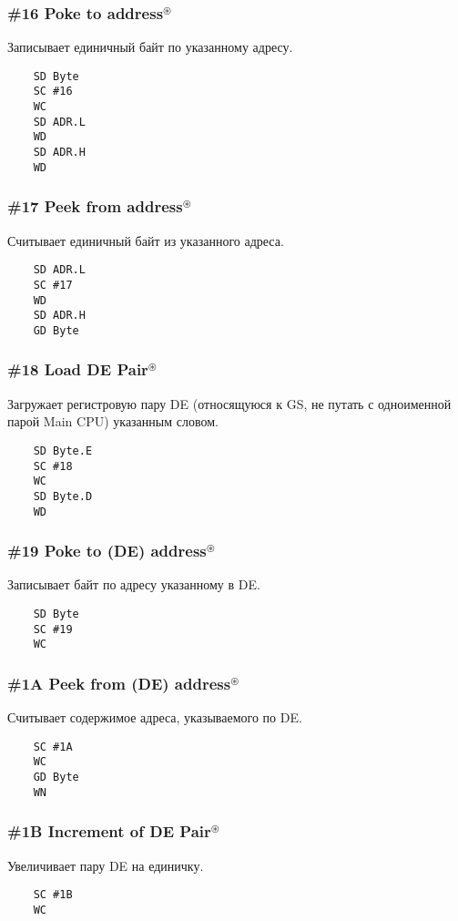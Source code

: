 \documentclass[a4paper,11pt]{article}
\DeclareRobustCommand{\Cyrax}{\texorpdfstring{\(^\circledast\)}{\circledast}}
\begin{document}
\subsubsection{\#16 Poke to address\Cyrax}
Записывает единичный байт по указанному адресу.
\begin{verbatim}
    SD Byte
    SC #16
    WC
    SD ADR.L
    WD
    SD ADR.H
    WD
\end{verbatim}

\subsubsection{\#17 Peek from address\Cyrax}
Считывает единичный байт из указанного адреса.
\begin{verbatim}
    SD ADR.L
    SC #17
    WD
    SD ADR.H
    GD Byte
\end{verbatim}

\subsubsection{\#18 Load DE Pair\Cyrax}
Загружает регистровую пару DE (относящуюся к GS, не путать с одноименной парой Main CPU) указанным словом.
\begin{verbatim}
    SD Byte.E
    SC #18
    WC
    SD Byte.D
    WD
\end{verbatim}

\subsubsection{\#19 Poke to (DE) address\Cyrax}
Записывает байт по адресу указанному в DE.
\begin{verbatim}
    SD Byte
    SC #19
    WC
\end{verbatim}

\subsubsection{\#1A Peek from (DE) address\Cyrax}
Считывает содержимое адреса, указываемого по DE.
\begin{verbatim}
    SC #1A
    WC
    GD Byte
    WN
\end{verbatim}

\subsubsection{\#1B Increment of DE Pair\Cyrax}
Увеличивает пару DE на единичку.
\begin{verbatim}
    SC #1B
    WC
\end{verbatim}
\end{document}
